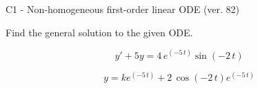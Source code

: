\begin{exercise}
  \begin{exerciseTitle}C1 - Non-homogeneous first-order linear ODE (ver. 82)\end{exerciseTitle}
  \begin{exerciseStatement}
    
Find the general solution to the given ODE.

    
\[y'+5y= 4 \, e^{\left(-5 \, t\right)} \sin\left(-2 \, t\right)\]

  \end{exerciseStatement}
  \begin{exerciseAnswer}
    
\[y= k e^{\left(-5 \, t\right)} + 2 \, \cos\left(-2 \, t\right) e^{\left(-5 \, t\right)}\]

  \end{exerciseAnswer}
\end{exercise}